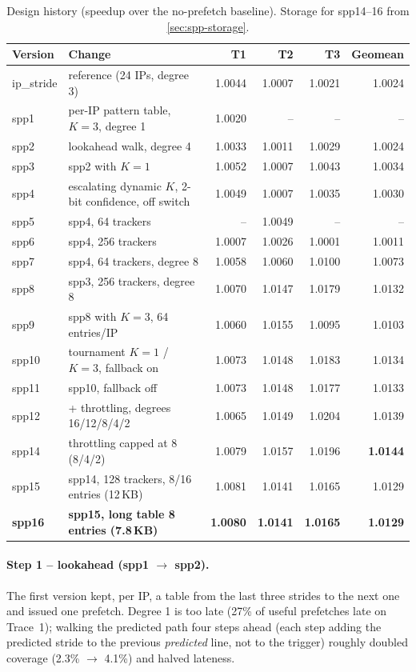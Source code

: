 \documentclass[11pt,a4paper]{article}
\theoremstyle{themethm}
\theoremstyle{themedef}
\theoremstyle{themeex}
\theoremstyle{themerem}
\newcommand{\tablesetup}{%
  \arrayrulecolor{tablerule}%
  \setlength{\aboverulesep}{0pt}\setlength{\belowrulesep}{0pt}%
  \renewcommand{\arraystretch}{1.3}%
  \rowcolors{2}{white}{tablerow}}
\newcommand{\colhead}[1]{\textbf{\color{tableheadtext}#1}}
\begin{document}
\begin{table}[htbp]
\centering
\caption{Design history (speedup over the no-prefetch baseline). Storage for spp14--16 from \cref{sec:spp-storage}.}\label{tab:evolution}
\tablesetup
\footnotesize
\begin{tabularx}{\linewidth}{lLrrrr}
\toprule
{}\colhead{Version} & \colhead{Change} & \colhead{T1} & \colhead{T2} & \colhead{T3} & \colhead{Geomean} \\
\midrule
ip\_stride & reference (24 IPs, degree 3) & 1.0044 & 1.0007 & 1.0021 & 1.0024 \\
spp1  & per-IP pattern table, $K=3$, degree 1 & 1.0020 & -- & -- & -- \\
spp2  & lookahead walk, degree 4 & 1.0033 & 1.0011 & 1.0029 & 1.0024 \\
spp3  & spp2 with $K=1$ & 1.0052 & 1.0007 & 1.0043 & 1.0034 \\
spp4  & escalating dynamic $K$, 2-bit confidence, off switch & 1.0049 & 1.0007 & 1.0035 & 1.0030 \\
spp5  & spp4, 64 trackers & -- & 1.0049 & -- & -- \\
spp6  & spp4, 256 trackers & 1.0007 & 1.0026 & 1.0001 & 1.0011 \\
spp7  & spp4, 64 trackers, degree 8 & 1.0058 & 1.0060 & 1.0100 & 1.0073 \\
spp8  & spp3, 256 trackers, degree 8 & 1.0070 & 1.0147 & 1.0179 & 1.0132 \\
spp9  & spp8 with $K=3$, 64 entries/IP & 1.0060 & 1.0155 & 1.0095 & 1.0103 \\
spp10 & tournament $K=1$ / $K=3$, fallback on & 1.0073 & 1.0148 & 1.0183 & 1.0134 \\
spp11 & spp10, fallback off & 1.0073 & 1.0148 & 1.0177 & 1.0133 \\
spp12 & + throttling, degrees 16/12/8/4/2 & 1.0065 & 1.0149 & 1.0204 & 1.0139 \\
spp14 & throttling capped at 8 (8/4/2) & 1.0079 & 1.0157 & 1.0196 & \textbf{1.0144} \\
spp15 & spp14, 128 trackers, 8/16 entries (12\,KB) & 1.0081 & 1.0141 & 1.0165 & 1.0129 \\
\textbf{spp16} & \textbf{spp15, long table 8 entries (7.8\,KB)} & \textbf{1.0080} & \textbf{1.0141} & \textbf{1.0165} & \textbf{1.0129} \\
\bottomrule
\end{tabularx}
\end{table}

\paragraph{Step 1 -- lookahead (spp1 $\to$ spp2).} The first version kept, per
IP, a table from the last three strides to the next one and issued one
prefetch. Degree 1 is too late (27\% of useful prefetches late on Trace~1);
walking the predicted path four steps ahead (each step adding the predicted
stride to the previous \emph{predicted} line, not to the trigger) roughly
doubled coverage (2.3\% $\to$ 4.1\%) and halved lateness.
\end{document}
